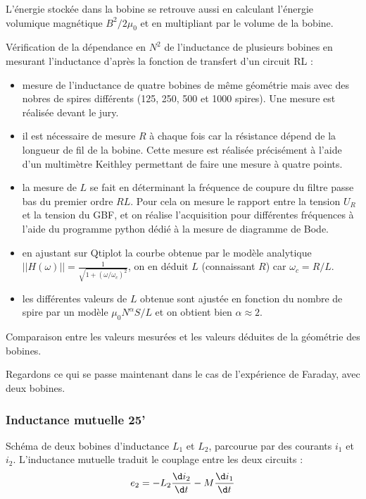 \begin{remarque}
L'énergie stockée dans la bobine se retrouve aussi en calculant l'énergie volumique magnétique $B^2/2\mu_0$ et en multipliant par le volume de la bobine.
\end{remarque}

\begin{experience}
Vérification de la dépendance en $N^2$ de l'inductance de plusieurs bobines en mesurant l'inductance d'après la fonction de transfert d'un circuit RL :
\begin{itemize}
\item mesure de l'inductance de quatre bobines de même géométrie mais avec des nobres de spires différents (125, 250, 500 et 1000 spires).
Une mesure est réalisée devant le jury.
\item il est nécessaire de mesure $R$ à chaque fois car la résistance dépend de la longueur de fil de la bobine. Cette mesure est réalisée précisément à l'aide d'un multimètre Keithley permettant de faire une mesure à quatre points.
\item la mesure de $L$ se fait en déterminant la fréquence de coupure du filtre passe bas du premier ordre $RL$.
Pour cela on mesure le rapport entre la tension $U_R$ et la tension du GBF, et on réalise l'acquisition pour différentes fréquences à l'aide du programme python dédié à la mesure de diagramme de Bode.
\item en ajustant sur Qtiplot la courbe obtenue par le modèle analytique $||H(\omega)|| = \frac{1}{\sqrt{1+(\omega/\omega_c)^2}}$, on en déduit $L$ (connaissant $R$) car $\omega_c = R/L$.
\item les différentes valeurs de $L$ obtenue sont ajustée en fonction du nombre de spire par un modèle $\mu_0N^\alpha S/L$ et on obtient bien $\alpha\approx2$.
\end{itemize}
Comparaison entre les valeurs mesurées et les valeurs déduites de la géométrie des bobines.
\end{experience}

\begin{transition}
Regardons ce qui se passe maintenant dans le cas de l'expérience de Faraday, avec deux bobines.
\end{transition}

\subsubsection{Inductance mutuelle 25'}

Schéma de deux bobines d'inductance $L_1$ et $L_2$, parcourue par des courants $i_1$ et $i_2$.
L'inductance mutuelle traduit le couplage entre les deux circuits :
\begin{equation}
e_2 = -L_2\frac{\d i_2}{\d t} - M\frac{\d i_1}{\d t}
\end{equation}


